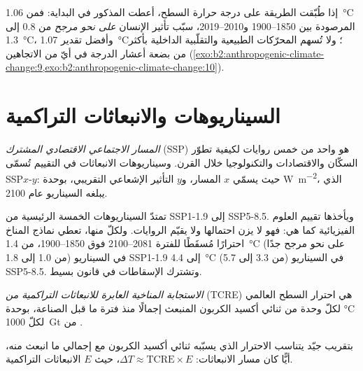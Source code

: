 إذا طُبّقت الطريقة على درجة حرارة السطح، أعطت  المذكور في البداية: فمن
\qty{1.06}{\celsius} المرصودة بين 1850--1900 و2010--2019، سبّب تأثير الإنسان \emph{على نحو مرجح}
من 0.8 إلى \qty{1.3}{\celsius}، وأفضل تقدير \qty{1.07}{\celsius}؛ ولا تُسهم المحرّكات الطبيعية
والتقلّبية الداخلية بأكثر من بضعة أعشار الدرجة في أيّ من الاتجاهين
(\cref{exo:b2:anthropogenic-climate-change:9,exo:b2:anthropogenic-climate-change:10}).

\section{السيناريوهات والانبعاثات التراكمية}\label{sec:b2:anthropogenic-climate-change:scenarios}

\begin{definition}\label{def:b2:anthropogenic-climate-change:ssp}
\emph{المسار الاجتماعي الاقتصادي المشترك} (SSP) هو واحد من خمس
روايات لكيفية تطوّر السكّان والاقتصادات والتكنولوجيا خلال القرن.
وسيناريوهات الانبعاثات في التقييم تُسمّى SSP$x$-$y$: حيث يسمّي $x$ المسار، و$y$
التأثير الإشعاعي التقريبي، بوحدة \unit{W.m^{-2}}، الذي يبلغه السيناريو عام 2100.
\end{definition}

تمتدّ السيناريوهات الخمسة الرئيسية من SSP1-1.9 إلى SSP5-8.5. ويأخذها تقييم العلوم الفيزيائية
كما هي: فهو لا يزن احتمالها ولا يقيّم الروايات. ولكلّ منها، تعطي نماذج المناخ
احترارًا مُسقَطًا للفترة 2081--2100 فوق 1850--1900، من \qty{1.4}{\celsius} (على نحو مرجح جدًا من 1.0
إلى 1.8) في السيناريو SSP1-1.9 إلى \qty{4.4}{\celsius} (من 3.3 إلى 5.7) في السيناريو SSP5-8.5. وتشترك الإسقاطات في
قانون بسيط.

\begin{definition}\label{def:b2:anthropogenic-climate-change:tcre}
\emph{الاستجابة المناخية العابرة للانبعاثات التراكمية من }
(TCRE) هي احترار السطح العالمي لكلّ وحدة من ثنائي أكسيد
الكربون المنبعث إجمالًا منذ فترة ما قبل الصناعة، بوحدة \unit{\celsius} لكلّ
\qty{1000}{Gt} من .
\end{definition}

\begin{proposition}\label{prop:b2:anthropogenic-climate-change:tcre}
بتقريب جيّد يتناسب الاحترار الذي يسبّبه ثنائي أكسيد الكربون مع إجمالي ما انبعث منه،
أيًّا كان مسار الانبعاثات: $\Delta T \approx \text{TCRE} \times E$، حيث $E$ الانبعاثات
التراكمية.
\end{proposition}
\admitted

